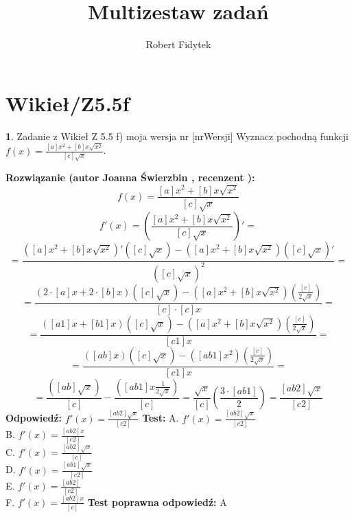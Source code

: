 \documentclass[12pt, a4paper]{article}
\title{Multizestaw zadań}
\author{Robert Fidytek}
\date{}
\theoremstyle{definition} %
\newtheorem{zad}{}
\newcommand{\kategoria}[1]{\section{#1}} %
\newcommand{\zadStart}[1]{\begin{zad}#1\newline} %
\newcommand{\zadStop}{\end{zad}}   %
\newcommand{\rozwStart}[2]{\noindent \textbf{Rozwiązanie (autor #1 , recenzent #2): }\newline} %
\newcommand{\rozwStop}{\newline}                                            %
\newcommand{\odpStart}{\noindent \textbf{Odpowiedź:}\newline}    %
\newcommand{\odpStop}{\newline}                                             %
\newcommand{\testStart}{\noindent \textbf{Test:}\newline} %
\newcommand{\testStop}{\newline} %
\newcommand{\kluczStart}{\noindent \textbf{Test poprawna odpowiedź:}\newline} %
\newcommand{\kluczStop}{\newline} %
\begin{document}
\maketitle


\kategoria{Wikieł/Z5.5f}
\zadStart{Zadanie z Wikieł Z 5.5 f) moja wersja nr [nrWersji]}
Wyznacz pochodną funkcji \\ $f(x)=\frac{[a]x^2+[b]x\sqrt{x^2}}{[c]\sqrt{x}}$.
\zadStop
\rozwStart{Joanna Świerzbin}{}
$$f(x)=\frac{[a]x^2+[b]x\sqrt{x^2}}{[c]\sqrt{x}}$$
$$f'(x)=\left(\frac{[a]x^2+[b]x\sqrt{x^2}}{[c]\sqrt{x}}\right)' = $$
$$ = \frac{\left([a]x^2+[b]x\sqrt{x^2}\right)'([c]\sqrt{x})- \left([a]x^2+[b]x\sqrt{x^2}\right) ([c]\sqrt{x})'}{([c]\sqrt{x})^2} = $$
$$  = \frac{\left(2\cdot[a]x+2\cdot[b]x\right)([c]\sqrt{x})- \left([a]x^2+[b]x\sqrt{x^2}\right) (\frac{[c]}{2\sqrt{x}})}{[c]\cdot[c]x} =  $$
$$  = \frac{\left([a1]x+[b1]x\right)([c]\sqrt{x})- \left([a]x^2+[b]x\sqrt{x^2}\right) (\frac{[c]}{2\sqrt{x}})}{[c1]x} =  $$
$$  = \frac{\left([ab]x\right)([c]\sqrt{x})- \left([ab1]x^2\right) (\frac{[c]}{2\sqrt{x}})}{[c1]x} =  $$
$$  = \frac{\left([ab]\sqrt{x}\right)}{[c]}-\frac{\left([ab1]x \frac{1}{2\sqrt{x}}\right)}{[c]} = \frac{\sqrt{x}}{[c]} \left(\frac{3\cdot[ab1]}{2}\right) =  \frac{[ab2]\sqrt{x}}{[c2]}  $$
\rozwStop
\odpStart
$ f'(x) = \frac{[ab2]\sqrt{x}}{[c2]}  $
\odpStop
\testStart
A. $ f'(x) = \frac{[ab2]\sqrt{x}}{[c2]}  $\\
B. $ f'(x) = \frac{[ab2]x}{[c2]}  $ \\
C. $ f'(x) = \frac{[ab2]\sqrt{x}}{[c]}  $ \\
D. $ f'(x) = \frac{[ab1]\sqrt{x}}{[c2]}  $\\
E. $ f'(x) = \frac{[ab2]}{[c2]}  $\\
F. $ f'(x) = \frac{[ab2]x}{[c]}  $
\testStop
\kluczStart
A
\kluczStop
\end{document}
